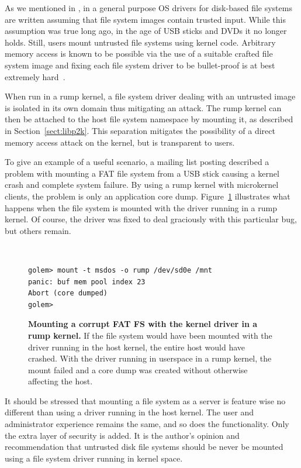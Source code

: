 As we mentioned in , in a general purpose OS
drivers for disk-based file systems are written assuming that file
system images contain trusted input.  While this assumption was true long ago,
in the age of USB sticks and DVDs it no longer holds.  Still, users
mount untrusted file systems using kernel code.  Arbitrary
memory access is known to be possible via the use of a suitable crafted
file system image and fixing each file system driver to
be bullet-proof is at best extremely hard~\cite{yang:exe}.

When run in a rump kernel, a file system driver dealing with an
untrusted image is isolated in its own domain thus mitigating an
attack.  The rump kernel can then be attached to the host file
system namespace by mounting it, as described in Section~\ref{sect:libp2k}.
This separation mitigates the possibility of a direct memory access attack on
the kernel, but is transparent to users.

To give an example of a useful scenario, a mailing list posting
described a problem with mounting a FAT file system from a USB
stick causing a kernel crash and complete system failure.  By using
a rump kernel with microkernel clients, the problem is only an
application core dump.  Figure~\ref{fig:msdoscrash} illustrates
what happens when the file system is mounted with the driver running
in a rump kernel.  Of course, the driver was fixed to deal graciously
with this particular bug, but others remain.

\begin{figure}[t]
{\tt \small
\begin{verbatim}
golem> mount -t msdos -o rump /dev/sd0e /mnt
panic: buf mem pool index 23
Abort (core dumped)
golem>
\end{verbatim}}
\caption[Mounting a corrupt FAT FS with the kernel driver in a rump kernel]{
\textbf{Mounting a corrupt FAT FS with the kernel driver in a rump kernel.}
If the file system would have been mounted with the driver running in the
host kernel, the entire host would have crashed.  With the driver running
in userspace in a rump kernel, the mount failed and a core dump was created
without otherwise affecting the host.
}
\label{fig:msdoscrash}
\end{figure}

It should be stressed that mounting a file system as a server is
feature wise no different than using a driver running in the host
kernel.  The user and administrator experience remains the same,
and so does the functionality.  Only the extra layer of security
is added.  It is the author's opinion and recommendation that
untrusted disk file systems should be never be mounted using a
file system driver running in kernel space.

